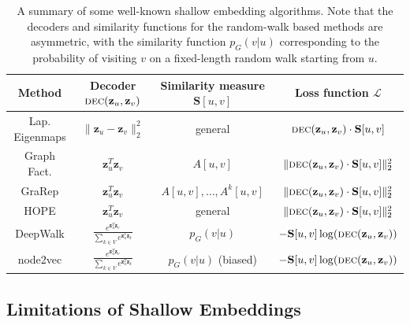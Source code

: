 \documentclass[10pt]{book}
\begin{document}
\begin{table}[ht]
    \centering
    \begin{tabular}{cccc}
        \toprule
        Method &  Decoder $\textsc{dec}(\mathbf{z}_u, \mathbf{z}_v)$ & Similarity measure $\mathbf S[u,v]$ & Loss function $\mathcal L$ \\
        \midrule
        Lap. Eigenmaps & $\|\mathbf{z}_u - \mathbf{z}_v\|_2^2$ & general & $\textsc{dec}(\mathbf{z}_u, \mathbf{z}_v)\cdot \mathbf S[u,v]$ \\
        
        Graph Fact. & $\mathbf{z}_u^T \mathbf{z}_v$ & $A[u,v]$ & $\|\textsc{dec}(\mathbf{z}_u, \mathbf{z}_v) \cdot \mathbf S[u,v]\|^2_2$ \\
        
        GraRep & $\mathbf{z}_u^T \mathbf{z}_v$ & $A[u,v],\ldots,A^k[u,v]$ & $\|\textsc{dec}(\mathbf{z}_u, \mathbf{z}_v) \cdot \mathbf S[u,v]\|^2_2$ \\
        
        HOPE & $\mathbf{z}_u^T \mathbf{z}_v$ & general & $\|\textsc{dec}(\mathbf{z}_u, \mathbf{z}_v) \cdot \mathbf S[u,v]\|^2_2$ \\
        
        DeepWalk & $\frac{e^{\mathbf{z}_u^T \mathbf{z}_v}}{\sum_{k \in V} e^{ \mathbf{z}_u^T \mathbf{z}_k}}$ & $p_G(v|u)$ & $- \mathbf S[u,v] \log(\textsc{dec}(\mathbf{z}_u, \mathbf{z}_v))$ \\
        
        node2vec & $\frac{e^{\mathbf{z}_u^T \mathbf{z}_v}}{\sum_{k \in V} e^{ \mathbf{z}_u^T \mathbf{z}_k}}$ & $p_G(v|u)$ (biased) & $- \mathbf S[u,v] \log(\textsc{dec}(\mathbf{z}_u, \mathbf{z}_v))$ \\
        \bottomrule
    \end{tabular}
    \caption{A summary of some well-known shallow embedding algorithms. Note that the decoders and similarity functions for the random-walk based methods are asymmetric, with the similarity function $p_G(v|u)$ corresponding to the probability of visiting $v$ on a fixed-length random walk starting from $u$.}
    \label{tab:shallowembalg}
\end{table}

\subsection{Limitations of Shallow Embeddings}
\end{document}
